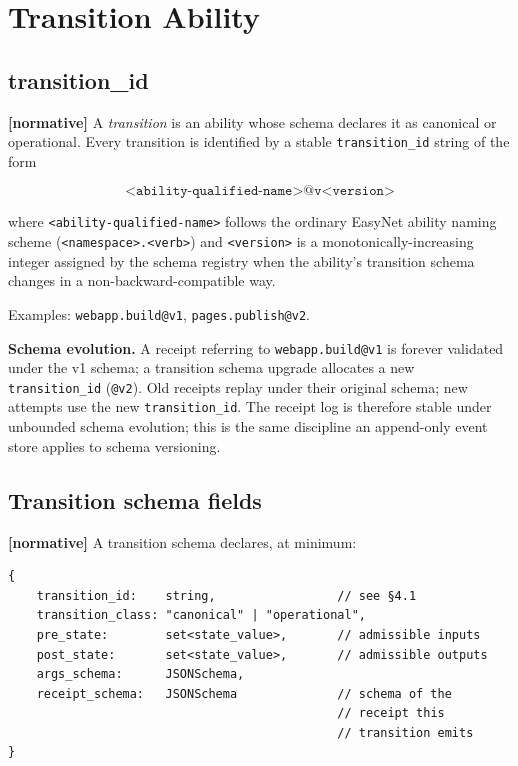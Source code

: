 \documentclass[11pt,a4paper]{article}
\newcommand{\normsv}{\textcolor{normativecolor}{\textbf{[normative]}}\xspace}
\theoremstyle{definition}
\begin{document}
\section{Transition Ability}
\label{sec:transition}

\subsection{transition\_id}

\normsv{}
A \emph{transition} is an ability whose schema declares it as
canonical or operational. Every transition is identified by a
stable \texttt{transition\_id} string of the form

\[
    \texttt{<ability-qualified-name>@v<version>}
\]

where \texttt{<ability-qualified-name>} follows the ordinary EasyNet
ability naming scheme (\texttt{<namespace>.<verb>}) and
\texttt{<version>} is a monotonically-increasing integer assigned by
the schema registry when the ability's transition schema changes in
a non-backward-compatible way.

Examples: \texttt{webapp.build@v1}, \texttt{pages.publish@v2}.

\textbf{Schema evolution.} A receipt referring to
\texttt{webapp.build@v1} is forever validated under the v1
schema; a transition schema upgrade allocates a new
\texttt{transition\_id} (\texttt{@v2}). Old receipts replay
under their original schema; new attempts use the new
\texttt{transition\_id}. The receipt log is therefore stable
under unbounded schema evolution; this is the same discipline an
append-only event store applies to schema versioning.

\subsection{Transition schema fields}

\normsv{}
A transition schema declares, at minimum:

\begin{lstlisting}
{
    transition_id:    string,                 // see §4.1
    transition_class: "canonical" | "operational",
    pre_state:        set<state_value>,       // admissible inputs
    post_state:       set<state_value>,       // admissible outputs
    args_schema:      JSONSchema,
    receipt_schema:   JSONSchema              // schema of the
                                              // receipt this
                                              // transition emits
}
\end{lstlisting}
\end{document}
